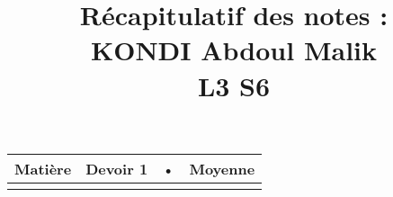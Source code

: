 \documentclass[12pt,a4paper, landscape]{article}
\title{Récapitulatif des notes : \\ KONDI Abdoul Malik \\ L3 S6 }
\begin{document}
\maketitle
\begin{longtable}{|p{5cm}|p{2cm}|p{2cm}|p{2cm}|}
\hline 
Matière & Devoir 1 & • & Moyenne \\ 
\hline 
 &  &  &  \\ 
\hline 
\end{longtable} 
\end{document}
